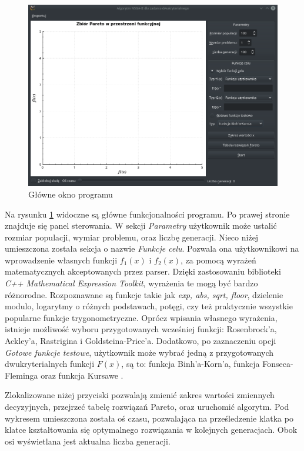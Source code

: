\documentclass[11pt,a4paper]{article}
\begin{document}
\begin{figure}[H]
\centering
\includegraphics[width=14cm]{program}
\caption{Główne okno programu}
\label{fig:program}
\end{figure}

Na rysunku \ref{fig:program} widoczne są główne funkcjonalności programu. Po prawej stronie znajduje się panel sterowania. W sekcji \textit{Parametry} użytkownik może ustalić rozmiar populacji, wymiar problemu, oraz liczbę generacji. Nieco niżej umieszczona została sekcja o nazwie \textit{Funkcje celu}. Pozwala ona użytkownikowi na wprowadzenie własnych funkcji \(f_1(x)\) i \(f_2(x)\), za pomocą wyrażeń matematycznych akceptowanych przez parser. Dzięki zastosowaniu biblioteki \textit{C++ Mathematical Expression Toolkit}, wyrażenia te mogą być bardzo różnorodne. Rozpoznawane są funkcje takie jak \textit{exp, abs, sqrt, floor}, dzielenie modulo, logarytmy o różnych podstawach, potęgi, czy też praktycznie wszystkie popularne funkcje trygonometryczne. Oprócz wpisania własnego wyrażenia, istnieje możliwość wyboru przygotowanych wcześniej funkcji:  Rosenbrock'a,  Ackley'a,  Rastrigina i Goldsteina-Price'a. Dodatkowo, po zaznaczeniu opcji \textit{Gotowe funkcje testowe}, użytkownik może wybrać jedną z przygotowanych dwukryterialnych funkcji \(F(x)\), są to: funkcja Binh'a-Korn'a, funkcja Fonseca-Fleminga oraz funkcja Kursawe \cite{wiki}.

Zlokalizowane niżej przyciski pozwalają zmienić zakres wartości zmiennych decyzyjnych, przejrzeć tabelę rozwiązań Pareto, oraz uruchomić algorytm. Pod wykresem umieszczona została oś czasu, pozwalająca na prześledzenie klatka po klatce kształtowania się optymalnego rozwiązania w kolejnych generacjach. Obok osi wyświetlana jest aktualna liczba generacji. 
\end{document}
